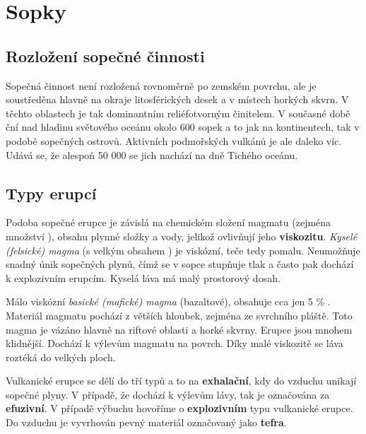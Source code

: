 \section{Sopky}
\subsection{Rozložení sopečné činnosti}
Sopečná činnost není rozložená rovnoměrně po zemském povrchu, ale je soustředěna hlavně na okraje litosférických desek a v místech horkých skvrn. V těchto oblastech je tak dominantním reliéfotvorným činitelem. V současné době ční nad hladinu světového oceánu okolo 600 sopek a to jak na kontinentech, tak v podobě sopečných ostrovů. Aktivních podmořských vulkánů je ale daleko víc. Udává se, že alespoň 50 000 se jich nachází na dně Tichého oceánu.

\subsection{Typy erupcí}
Podoba sopečné erupce je závislá na chemickém složení magmatu (zejména množství ), obsahu plynné složky a vody, jelikož ovlivňují jeho \textbf{viskozitu}. \emph{Kyselé (felsické) magma} (s velkým obsahem ) je viskózní, teče tedy pomalu. Neumožňuje snadný únik sopečných plynů, čímž se v sopce stupňuje tlak a často pak dochází k explozivním erupcím. Kyselá láva má malý prostorový dosah.

Málo viskózní \emph{basické (mafické) magma} (bazaltové), obsahuje cca jen 5 \% . Materiál magmatu pochází z větších hloubek, zejména ze svrchního pláště. Toto magma je vázáno hlavně na riftové oblasti a horké skvrny. Erupce jsou mnohem klidnější. Dochází k výlevům magmatu na povrch. Díky malé viskozitě se láva roztéká do velkých ploch.

Vulkanické erupce se dělí do tří typů a to na \textbf{exhalační}, kdy do vzduchu unikají sopečné plyny. V případě, že dochází k výlevům lávy, tak je označována za \textbf{efuzivní}. V případě výbuchu hovoříme o \textbf{explozivním} typu vulkanické erupce. Do vzduchu je vyvrhován pevný materiál označovaný jako \textbf{tefra}.

